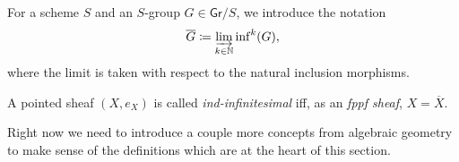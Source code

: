 \begin{ntt}\label{not:GBar}
	For a scheme $S$ and an $S$-group $G \in \mathsf{Gr}/S$, we introduce
	the notation 
	\begin{equation*}
	\overline{G} \coloneqq \varinjlim_{k \in \mathbb{N}} \mathrm{inf}^k(G)
	,\end{equation*}
	where the limit is taken with respect to the natural inclusion morphisms.
\end{ntt} 


\begin{defn}
	A pointed sheaf $\left(X, e_X\right)$ is called \emph{ind-infinitesimal} iff,
	as an \emph{fppf sheaf}, $X = \overline{X}$.
\end{defn}


\noindent
Right now we need to introduce a couple more concepts from algebraic
geometry to make sense of the definitions which are at the heart of this section.
%


